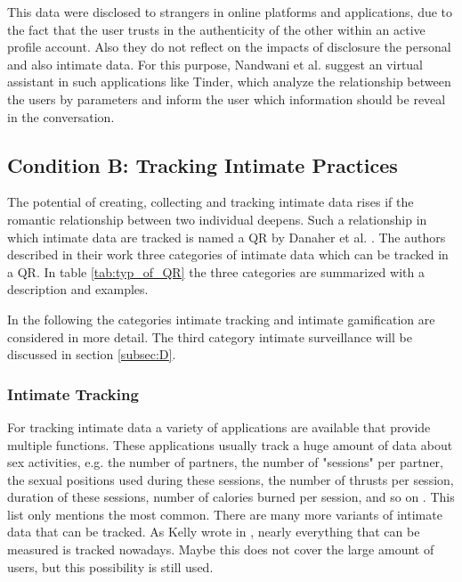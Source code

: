 This data were disclosed to strangers in online platforms and applications, due to the fact that the user trusts in the authenticity of the other within an active profile account. Also they do not reflect on the impacts of disclosure the personal and also intimate data. For this purpose, Nandwani et al. \cite{10.1007/978-3-319-61542-4_32} suggest an virtual assistant in such applications like Tinder, which analyze the relationship between the users by parameters and inform the user which information should be reveal in the conversation.



\subsection{Condition B: Tracking Intimate Practices}
\label{subsec:B}
The potential of creating, collecting and tracking intimate data rises if the romantic relationship between two individual deepens. Such a relationship in which intimate data are tracked is named a \ac{QR} by Danaher et al. \cite{doi:10.1080/15265161.2017.1409823}.
The authors described in their work three categories of intimate data which can be tracked in a \acs{QR}. In table \ref{tab:typ_of_QR} the three categories are summarized with a description and examples.

In the following the categories intimate tracking and intimate gamification are considered in more detail.
The third category intimate surveillance will be discussed in section \ref{subsec:D}.

\subsubsection{Intimate Tracking}
For tracking intimate data a variety of applications are available that provide multiple functions. These applications usually track a huge amount of data about sex activities, e.g. the number of partners, the number of "sessions" per partner, the sexual positions used during these sessions, the number of thrusts per session, duration of these sessions, number of calories burned per session, and so on \cite{doi:10.1080/15265161.2017.1409823}. 
This list only mentions the most common. There are many more variants of intimate data that can be tracked. As Kelly wrote in \cite{kelly2017inevitable}, nearly everything that can be measured is tracked nowadays. Maybe this does not cover the large amount of users, but this possibility is still used.

